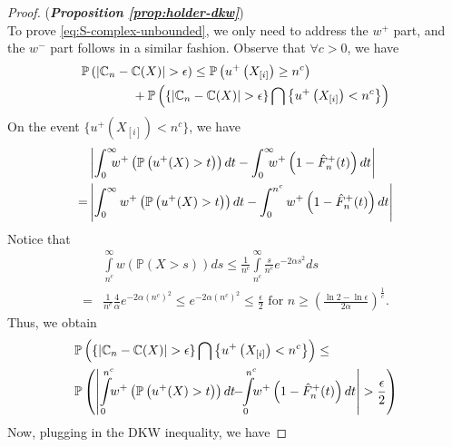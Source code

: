\begin{proof}(\textbf{\textit{Proposition \ref{prop:holder-dkw}}})\ \\
To prove \eqref{eq:S-complex-unbounded}, we only need to 
address the $w^+$ part, and the $w^-$ part follows in a similar fashion.
Observe that $\forall c > 0$, we have 
\begin{align*}
&\mathbb{P}\left(\left|\mathbb{C}_n -\mathbb{C}(X) \right| > \epsilon \right) \leq \mathbb{P}\left(u^+\left(X_{[i]}\right) \geq n^c \right)\nonumber\\
& \qquad\qquad+ \mathbb{P}\left(\{\left|\mathbb{C}_n -\mathbb{C}(X) \right| > \epsilon\} \bigcap \left\{u^+\left(X_{[i]}\right) < n^c\right\}\right)
\end{align*}
On the event $\{u^+\left(X_{[i]}\right) < n^c\}$, we have
\begin{align*}
&\left|\int_0^{\infty}\!\!\!\! w^+\left(\Prob{u^+(X)>t}\right) dt- \int_0^{\infty} \!\!\!\! w^+\left(1- {\hat F^+_n}(t)\right) dt\right| \\ = &
    \left|\int_0^{\infty} w^+\left(\Prob{u^+(X)>t}\right) dt- \int_0^{n^c} w^+\left(1- {\hat F^+_n}(t)\right) dt\right|
\end{align*}
Notice  that
\begin{align*}
&\int\limits_{n^c}^\infty w\left(\mathbb{P} \left( X > s \right)\right) ds
\leq \frac{1}{n^c} \int\limits_{n^c}^\infty \frac{s}{n^c} e^{-2\alpha s^2} ds\\
=&\frac{1}{n^c} \frac{4}{\alpha} e^{-2\alpha \left(n^c\right)^2} \leq e^{-2\alpha \left(n^c\right)^2} \leq \frac{\epsilon}{2} \text{ for } n \geq \left(\frac{\ln2 - \ln\epsilon}{2\alpha}\right)^{\frac{1}{c}}.
\end{align*}
Thus, we obtain
\begin{align*}
&\mathbb{P}\left(\{\left|\C_n -\C(X) \right| > \epsilon\} \bigcap \left\{u^+\left(X_{[i]}\right) < n^c\right\}\right)\leq \\ 
&\mathbb{P}\left(\left|\int\limits_0^{n^c}\!\! w^+ \left(\Prob{u^+(X)>t}\right)dt \!\!-\!\! 
\int\limits_0^{n^c}\!\!w^+\left(1- {\hat F^+_n}(t)\right) dt\right| > \frac{\epsilon}{2}\right)
\end{align*}
Now, plugging in the DKW inequality, we have

\end{proof}
